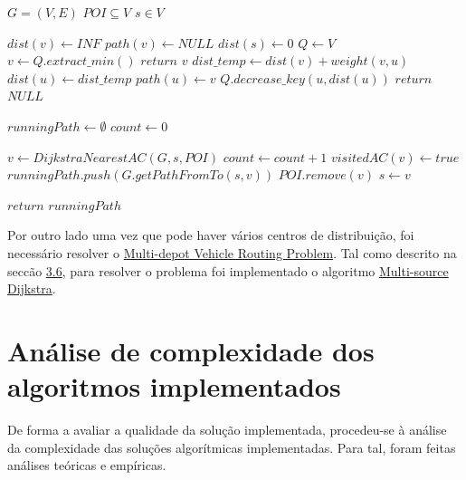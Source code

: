 \documentclass[12pt,a4paper]{report}
\begin{document}
\begin{center}
	\begin{algorithmic}[1]
		\State $G = (V, E)$
		\State $POI \subseteq V$
		\State $s \in V$
		\newline

			\State $dist(v) \leftarrow INF$
			\State $path(v) \leftarrow NULL$
		\EndFor
		\State $dist(s) \leftarrow 0$
		\State $Q \leftarrow V$
			\State $v \leftarrow Q.extract\_min()$
				\State $return$ $v$
			\EndIf
				\State $dist\_temp \leftarrow dist(v) + weight(v,u)$
					\State $dist(u) \leftarrow dist\_temp$
					\State $path(u) \leftarrow v$
					\State $Q.decrease\_key(u,dist(u))$
				\EndIf
			\EndFor
		\EndWhile
		\State $return$ $NULL$
		\EndFunction
		\newline

		\State $runningPath \leftarrow \emptyset$
		\State $count \leftarrow 0$

			\State $v \leftarrow DijkstraNearestAC(G, s, POI)$
			\State $count \leftarrow count + 1$
			\State $visitedAC(v) \leftarrow true$
			\State $runningPath.push(G.getPathFromTo(s, v))$
			\State $POI.remove(v)$
			\State $s \leftarrow v$

		\EndWhile
		\State $return$ $runningPath$
		\EndFunction
	\end{algorithmic}
\end{center}


Por outro lado uma vez que pode haver vários centros de distribuição, foi necessário resolver o \hyperref[perpetivas:mdvrp]{Multi-depot Vehicle Routing Problem}. 
Tal como descrito na seccão \hyperref[perpetivas:mdvrp]{3.6}, para resolver o problema foi implementado o algoritmo \hyperref[algo:msdijkstra]{Multi-source Dijkstra}.



\chapter{Análise de complexidade dos algoritmos implementados}

De forma a avaliar a qualidade da solução implementada, procedeu-se à análise da complexidade das soluções algorítmicas implementadas. 
Para tal, foram feitas análises teóricas e empíricas.
\end{document}
